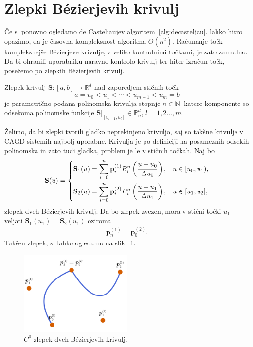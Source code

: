 \documentclass[isrm2, tisk]{fmfdelo}
\newcommand{\R}{\mathbb R}
\newcommand{\N}{\mathbb N}
\newcommand{\Pn}{\mathbb P_n}
\newcommand{\p}{\mathbf{p}}
\begin{document}
    \section{Zlepki Bézierjevih krivulj}
    Če si ponovno ogledamo de Casteljaujev algoritem~\ref{alg:decasteljau}, lahko hitro opazimo, da je časovna kompleksnost algoritma $O(n^2)$.
    Računanje točk kompleksnejše Bézierjeve krivulje, z veliko kontrolnimi točkami,  je zato zamudno.
    Da bi ohranili uporabniku naravno kontrolo krivulj ter hiter izračun točk, posežemo po zlepkih Bézierjevih krivulj.
    \begin{definicija}
        Zlepek krivulj $\mathbf{S}:[a,b]\to \R^d$ nad zaporedjem stičnih točk \[a=u_0 < u_1 < \cdots < u_{m-1} < u_m = b\] je parametrično podana polinomska krivulja stopnje $n\in\N$, katere komponente so odsekoma polinomske funkcije $\mathbf{S}|_{[u_{l-1},u_l]} \in \Pn^d$, $l=1,2\ldots,m$.
    \end{definicija}
    \noindent Želimo, da bi zlepki tvorili gladko neprekinjeno krivuljo, saj so takšne krivulje v CAGD sistemih najbolj uporabne.
    Krivulja je po definiciji na posameznih odsekih polinomska in zato tudi gladka, problem je le v stičnih točkah.
    Naj bo
    \begin{align}
        \mathbf{S}(u) = \begin{dcases}
                            \mathbf{S}_1(u) = \sum_{i=0}^n \p_i^{(1)}B_i^n\left(\frac{u-u_0}{\Delta u_0}\right), & u \in [u_0,u_1),  \\
                            \mathbf{S}_2(u) = \sum_{i=0}^n \p_i^{(2)}B_i^n\left(\frac{u-u_1}{\Delta u_1}\right), & u \in [u_1,u_2],
        \end{dcases} \label{eq:zlepek-def}
    \end{align}
    zlepek dveh Bézierjevih krivulj.
    Da bo zlepek zvezen, mora v stični točki $u_1$ veljati $\mathbf{S}_1(u_1) = \mathbf{S}_2(u_1)$ oziroma
    \begin{align}
        \label{c0-zlepek-ref}
        \p_n^{(1)} = \p_0^{(2)}.
    \end{align}
    Takšen zlepek, si lahko ogledamo na sliki~\ref{fig:zlepek-c0}.
    \begin{figure}[h]
        \centering
        \includegraphics[width = 0.50\textwidth]{images/zlepek-c0}
        \caption{$C^0$ zlepek dveh Bézierjevih krivulj.}
        \label{fig:zlepek-c0}
    \end{figure}
\end{document}
